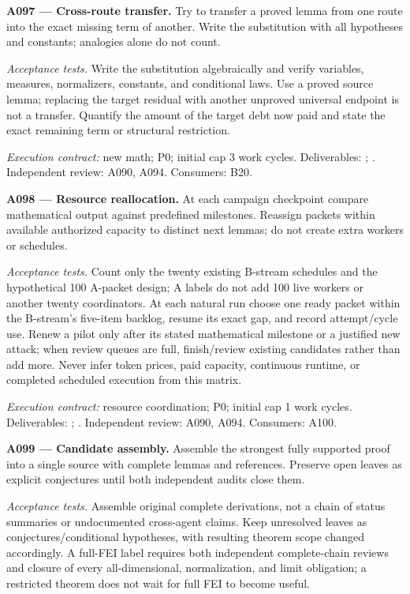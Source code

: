 \documentclass[11pt]{article}
\begin{document}
\textbf{A097 --- Cross-route transfer.} Try to transfer a proved lemma from one route into the exact missing term of another. Write the substitution with all hypotheses and constants; analogies alone do not count.

\emph{Acceptance tests.} Write the substitution algebraically and verify variables, measures, normalizers, constants, and conditional laws. Use a proved source lemma; replacing the target residual with another unproved universal endpoint is not a transfer. Quantify the amount of the target debt now paid and state the exact remaining term or structural restriction.

{\small\emph{Execution contract:} new math; P0; initial cap 3 work cycles. Deliverables: ; . Independent review: A090, A094. Consumers: B20.}

\textbf{A098 --- Resource reallocation.} At each campaign checkpoint compare mathematical output against predefined milestones. Reassign packets within available authorized capacity to distinct next lemmas; do not create extra workers or schedules.

\emph{Acceptance tests.} Count only the twenty existing B-stream schedules and the hypothetical 100 A-packet design; A labels do not add 100 live workers or another twenty coordinators. At each natural run choose one ready packet within the B-stream's five-item backlog, resume its exact gap, and record attempt/cycle use. Renew a pilot only after its stated mathematical milestone or a justified new attack; when review queues are full, finish/review existing candidates rather than add more. Never infer token prices, paid capacity, continuous runtime, or completed scheduled execution from this matrix.

{\small\emph{Execution contract:} resource coordination; P0; initial cap 1 work cycles. Deliverables: ; . Independent review: A090, A094. Consumers: A100.}

\textbf{A099 --- Candidate assembly.} Assemble the strongest fully supported proof into a single source with complete lemmas and references. Preserve open leaves as explicit conjectures until both independent audits close them.

\emph{Acceptance tests.} Assemble original complete derivations, not a chain of status summaries or undocumented cross-agent claims. Keep unresolved leaves as conjectures/conditional hypotheses, with resulting theorem scope changed accordingly. A full-FEI label requires both independent complete-chain reviews and closure of every all-dimensional, normalization, and limit obligation; a restricted theorem does not wait for full FEI to become useful.
\end{document}
